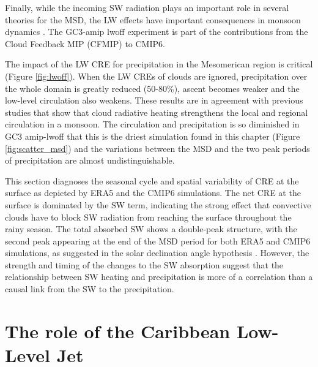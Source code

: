 Finally, while the incoming SW radiation plays an important role in several theories for the MSD, the LW effects have important consequences in monsoon dynamics \citep{guo2015,byrne2020}. 
The GC3-amip lwoff experiment is part of the contributions from the Cloud Feedback MIP (CFMIP)  \citep{webb2017} to CMIP6. 

The impact of the LW CRE for precipitation in the Mesomerican region is critical (Figure \ref{fig:lwoff}). When the LW CREs of clouds are ignored, precipitation over the whole domain is greatly reduced (50-80\%), ascent becomes weaker and the low-level circulation also weakens. 
These results are in agreement with previous studies \citep{guo2015,byrne2020} that show that cloud radiative heating strengthens the local and regional circulation in a monsoon. The circulation and precipitation is so diminished in GC3 amip-lwoff that this is the driest simulation found in this chapter (Figure \ref{fig:scatter_msd}) and the variations between the MSD and the two peak periods of precipitation are almost undistinguishable. 

This section diagnoses the seasonal cycle and spatial variability of CRE at the surface as depicted by ERA5 and the CMIP6 simulations. The net CRE at the surface is dominated by the SW term, indicating the strong effect that convective clouds have to block SW radiation from reaching the surface throughout the rainy season. The total absorbed SW shows a double-peak structure, with the second peak appearing at the end of the MSD period for both ERA5 and CMIP6 simulations, as suggested in the solar declination angle hypothesis \cite{karnauskas2013}. However, the strength and timing of the changes to the SW absorption suggest that the relationship between SW heating and precipitation is more of a correlation than a causal link from the SW to the precipitation. 

\section{The role of the Caribbean Low-Level Jet}


